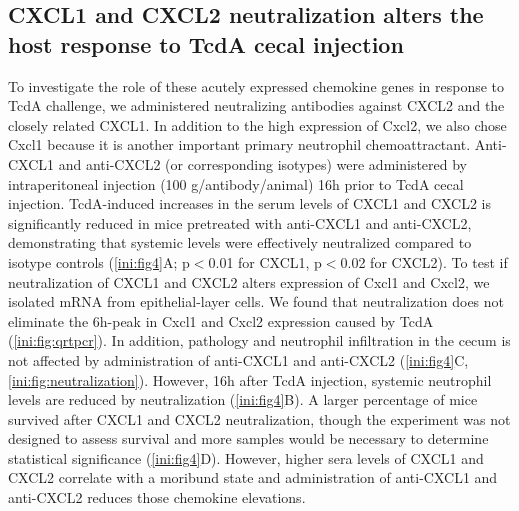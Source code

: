 \subsection{CXCL1 and CXCL2 neutralization alters the host response to 
            TcdA cecal injection}
To investigate the role of these acutely expressed chemokine genes 
in response to TcdA challenge, we administered neutralizing antibodies 
against CXCL2 and the closely related CXCL1. In addition to the high 
expression of Cxcl2, we also chose Cxcl1 because it is another 
important primary neutrophil chemoattractant. Anti-CXCL1 and anti-CXCL2 
(or corresponding isotypes) were administered by intraperitoneal 
injection (100 \textmugreek{}g/antibody/animal) 16h prior to TcdA cecal 
injection. TcdA-induced increases in the serum levels of CXCL1 and 
CXCL2 is significantly reduced in mice pretreated with anti-CXCL1 
and anti-CXCL2, demonstrating that systemic levels were effectively 
neutralized compared to isotype controls (\autoref{ini:fig4}A; 
p$<$0.01 for CXCL1, p$<$0.02 for CXCL2). To test if neutralization 
of CXCL1 and CXCL2 alters expression of Cxcl1 and Cxcl2, we 
isolated mRNA from epithelial-layer cells. We found that neutralization 
does not eliminate the 6h-peak in Cxcl1 and Cxcl2 expression caused by 
TcdA (\autoref{ini:fig:qrtpcr}). In addition, pathology and neutrophil 
infiltration in the cecum is not affected by administration of 
anti-CXCL1 and anti-CXCL2 (\autoref{ini:fig4}C, \autoref{ini:fig:neutralization}). 
However, 16h after TcdA injection, systemic neutrophil levels are 
reduced by neutralization (\autoref{ini:fig4}B). A larger percentage 
of mice survived after CXCL1 and CXCL2 neutralization, though the 
experiment was not designed to assess survival and more samples would 
be necessary to determine statistical significance (\autoref{ini:fig4}D). 
However, higher sera levels of CXCL1 and CXCL2 correlate with a moribund 
state and administration of anti-CXCL1 and anti-CXCL2 reduces those 
chemokine elevations.

